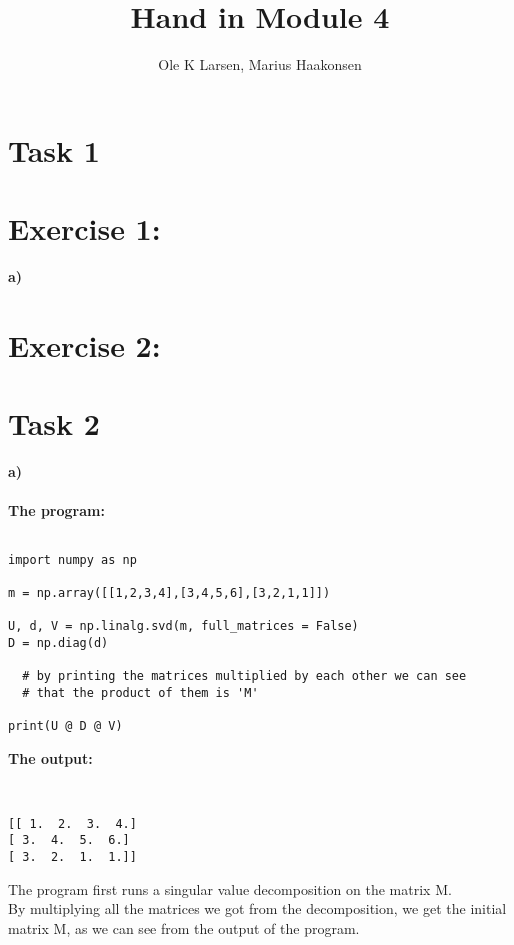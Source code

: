 \documentclass[11pt]{amsart}
\title{Hand in Module 4}
\author{Ole K Larsen, Marius Haakonsen}
\begin{document}
	\maketitle

	\section{Task 1}
	\section{Exercise 1:}

	\textbf{a)}\\


	\section{Exercise 2:}




\section{Task 2}

\textbf{a)}\\\\

\textbf{The program: }

\begin{verbatim}

import numpy as np

m = np.array([[1,2,3,4],[3,4,5,6],[3,2,1,1]])

U, d, V = np.linalg.svd(m, full_matrices = False)
D = np.diag(d)

  # by printing the matrices multiplied by each other we can see
  # that the product of them is 'M'

print(U @ D @ V)

\end{verbatim}



\textbf{The output:}

\begin{verbatim}


[[ 1.  2.  3.  4.]
[ 3.  4.  5.  6.]
[ 3.  2.  1.  1.]]

\end{verbatim}

The program first runs a singular value decomposition on the matrix M. \\
By multiplying all the matrices we got from the decomposition, we get the initial matrix M, as we can see from the output of the program. \\\\
\end{document}

